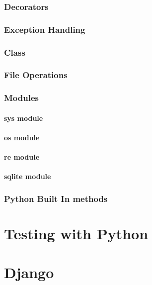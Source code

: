 \documentclass[letterpaper,12pt]{book}
\begin{document}
\section{Decorators}
\section{Exception Handling}
\section{Class}
\section{File Operations}
\section{Modules}
\subsection{sys module}
\subsection{os module}
\subsection{re module}
\subsection{sqlite module}
\section{Python Built In methods}
\part{Testing with Python}
\part{Django}
\end{document}
